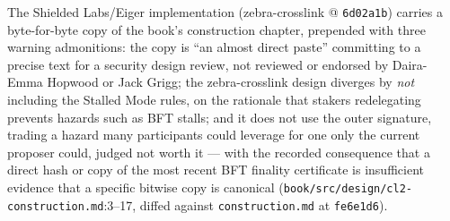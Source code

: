 \documentclass[11pt,a4paper]{article}
\theoremstyle{definition}
\begin{document}
The Shielded Labs/Eiger implementation (zebra-crosslink @
\texttt{6d02a1b}) carries a byte-for-byte copy of the book's construction
chapter, prepended with three warning admonitions: the copy is ``an
almost direct paste'' committing to a precise text for a security design
review, not reviewed or endorsed by Daira-Emma Hopwood or Jack Grigg; the
zebra-crosslink design diverges by \emph{not} including the Stalled Mode
rules, on the rationale that stakers redelegating prevents hazards such
as BFT stalls; and it does not use the outer signature, trading a hazard
many participants could leverage for one only the current proposer could,
judged not worth it --- with the recorded consequence that a direct hash
or copy of the most recent BFT finality certificate is insufficient
evidence that a specific bitwise copy is canonical
(\texttt{book/src/design/cl2-construction.md}:3--17, diffed against
\texttt{construction.md} at \texttt{fe6e1d6}).
\end{document}
